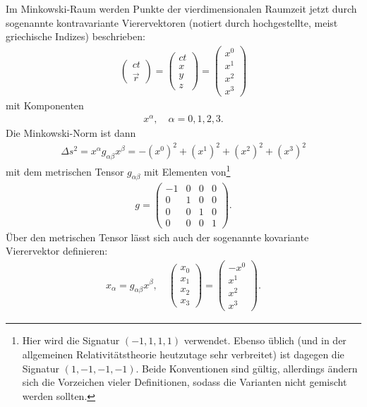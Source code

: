 Im Minkowski-Raum werden Punkte der vierdimensionalen Raumzeit jetzt durch sogenannte kontravariante Vierervektoren (notiert durch hochgestellte, meist griechische Indizes) beschrieben:
\begin{align*}
    \begin{pmatrix} ct \\ \vec r \end{pmatrix} = \begin{pmatrix} ct \\ x \\ y \\ z \end{pmatrix}   = \begin{pmatrix} x^0 \\ x^1 \\ x^2 \\ x^3 \end{pmatrix}
\end{align*}
mit Komponenten
\begin{align*}
    x^\alpha,\quad \alpha=0,1,2,3.
\end{align*}
Die Minkowski-Norm ist dann
\begin{align*}
    \Delta s^2=x^\alpha g_{\alpha\beta}x^\beta=-(x^0)^2+(x^1)^2+(x^2)^2+(x^3)^2
\end{align*}
mit dem metrischen Tensor $g_{\alpha\beta}$ mit Elementen von\footnote{Hier wird die Signatur $(-1,1,1,1)$ verwendet. Ebenso üblich (und in der allgemeinen Relativitätstheorie heutzutage sehr verbreitet) ist dagegen die Signatur $(1,-1,-1,-1)$. Beide Konventionen sind gültig, allerdings ändern sich die Vorzeichen vieler Definitionen, sodass die Varianten nicht gemischt werden sollten. }
\begin{align*}
    g = \begin{pmatrix}
            -1 & 0 & 0 & 0 \\
            0  & 1 & 0 & 0 \\
            0  & 0 & 1 & 0 \\
            0  & 0 & 0 & 1
        \end{pmatrix}.
\end{align*}
Über den metrischen Tensor lässt sich auch der sogenannte kovariante Vierervektor definieren:
\begin{align*}
    x_\alpha=g_{\alpha\beta}x^\beta, \quad \begin{pmatrix} x_0 \\ x_1 \\ x_2 \\ x_3 \end{pmatrix}=\begin{pmatrix} -x^0 \\ x^1 \\ x^2 \\ x^3 \end{pmatrix}.
\end{align*}
